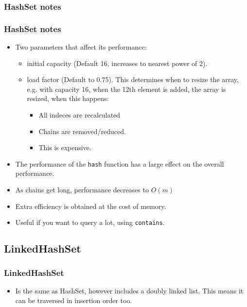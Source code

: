 \documentclass{beamer}
\begin{document}
\subsubsection{HashSet notes}
\begin{frame}
\frametitle{HashSet notes}
\begin{itemize}
\item Two parameters that affect its performance:
\begin{itemize}
\item {\color{red} initial capacity} (Default 16, increases to nearest power of 2).
\item {\color{green} load factor} (Default to 0.75). This determines when to resize the array, e.g. with capacity 16, when the 12th element is added, the array is resized, when this happens:
\begin{itemize}
\item All indeces are recalculated
\item Chains are removed/reduced.
\item This is expensive.
\end{itemize}
\end{itemize}
\item The performance of the \texttt{hash} function has a large effect on the overall performance.
\item As chains get long, performance decreases to $O(m)$ 
\item Extra efficiency is obtained at the cost of memory.
\item Useful if you want to query a lot, using \texttt{contains}. 
\end{itemize}
\end{frame}
\subsection{LinkedHashSet}
\begin{frame}
\frametitle{LinkedHashSet}
\begin{itemize}
\item Is the same as HashSet, however includes a {\color{red} doubly linked list}. This means it can be traversed in insertion order too.
\end{itemize}
\end{frame}
\end{document}
